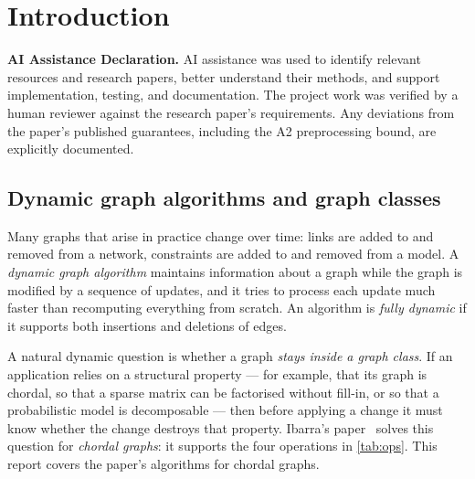 \documentclass[11pt,a4paper,oneside]{report}
\theoremstyle{plain}
\theoremstyle{definition}
\theoremstyle{remark}
\begin{document}
\cleardoublepage
{}
\newcommand{\ExGraphNodes}{%
  \node[vtx] (g0) at (0,1.6) {0};
  \node[vtx] (g3) at (1.6,1.6) {3};
  \node[vtx] (g1) at (0,0) {1};
  \node[vtx] (g2) at (1.6,0) {2};
  \node[vtx] (g6) at (3.1,1.6) {6};
  \node[vtx] (g4) at (3.1,0.15) {4};
  \node[vtx] (g5) at (2.45,-1.15) {5};
}
\newcommand{\ExGraphEdges}{%
  \draw[gedge] (g0)--(g1) (g1)--(g3) (g0)--(g2) (g2)--(g3) (g2)--(g4) (g2)--(g5)
               (g4)--(g5) (g3)--(g6) (g0)--(g3) (g1)--(g2);
}

\chapter{Introduction}\label{ch:intro}

\noindent\textbf{AI Assistance Declaration.}
AI assistance was used to identify relevant resources and research papers, better understand their methods, and support implementation, testing, and documentation. The project work was verified by a human reviewer against the research paper's requirements. Any deviations from the paper's published guarantees, including the A2 preprocessing bound, are explicitly documented.

\section{Dynamic graph algorithms and graph classes}
Many graphs that arise in practice change over time: links are added to and removed from a
network, constraints are added to and removed from a model. A \emph{dynamic graph algorithm}
maintains information about a graph while the graph is modified by a sequence of updates, and
it tries to process each update much faster than recomputing everything from scratch. An
algorithm is \emph{fully dynamic} if it supports both insertions and deletions of edges.

A natural dynamic question is whether a graph \emph{stays inside a graph class}. If an
application relies on a structural property --- for example, that its graph is chordal, so that
a sparse matrix can be factorised without fill-in, or so that a probabilistic model is
decomposable --- then before applying a change it must know whether the change destroys that
property. Ibarra's paper~\cite{ibarra2008} solves this question for \emph{chordal graphs}: it supports
the four operations in \cref{tab:ops}. This report covers the paper's algorithms for chordal
graphs.
\end{document}
